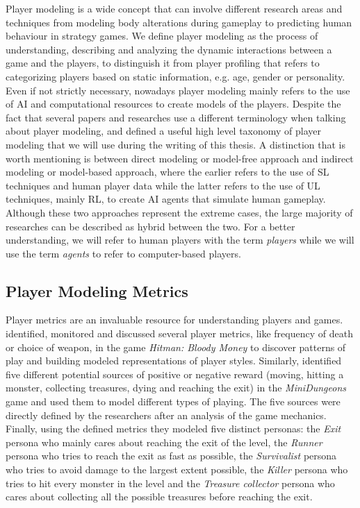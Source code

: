 Player modeling is a wide concept that can involve different research areas and techniques from modeling body alterations during gameplay to predicting human behaviour in strategy games. We define player modeling as the process of understanding, describing and analyzing the dynamic interactions between a game and the players, to distinguish it from player profiling that refers to categorizing players based on static information, e.g. age, gender or personality. Even if not strictly necessary, nowadays player modeling mainly refers to the use of \acs{AI} and computational resources to create models of the players. Despite the fact that several papers and researches use a different terminology when talking about player modeling, \textcite{smith_inclusive_2011} and \textcite{yannakakis_player_2013} defined a useful high level taxonomy of player modeling that we will use during the writing of this thesis. A distinction that is worth mentioning is between direct modeling or model-free approach and indirect modeling or model-based approach, where the earlier refers to the use of \acf{SL} techniques and human player data while the latter refers to the use of \acf{UL} techniques, mainly \acs{RL}, to create \acs{AI} agents that simulate human gameplay. Although these two approaches represent the extreme cases, the large majority of researches can be described as hybrid between the two. For a better understanding, we will refer to human players with the term \textit{players} while we will use the term \textit{agents} to refer to computer-based players.

\subsection{Player Modeling Metrics} \label{Player_Modeling_Metrics}
Player metrics are an invaluable resource for understanding players and games. \textcite{tychsen_defining_2008} identified, monitored and discussed several player metrics, like frequency of death or choice of weapon, in the game \textit{Hitman: Bloody Money} to discover patterns of play and building modeled representations of player styles. 
Similarly, \textcite{holmgard_evolving_2014} identified five different potential sources of positive or negative reward (moving, hitting a monster, collecting treasures, dying and reaching the exit) in the \textit{MiniDungeons} game and used them to model different types of playing. The five sources were directly defined by the researchers after an analysis of the game mechanics. Finally, using the defined metrics they modeled five distinct personas: the \textit{Exit} persona who mainly cares about reaching the exit of the level, the \textit{Runner} persona who tries to reach the exit as fast as possible, the \textit{Survivalist} persona who tries to avoid damage to the largest extent possible, the \textit{Killer} persona who tries to hit every monster in the level and the \textit{Treasure collector} persona who cares about collecting all the possible treasures before reaching the exit.

